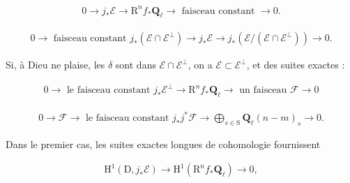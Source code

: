 \documentclass[10pt,leqno]{article}
\begin{document}
\begin{equation*}\begin{gathered}0 \longrightarrow  j_{*}\mathcal{E}  \longrightarrow  \mathrm{R}^{n} f_{*}\mathbf{Q}_{\ell } \longrightarrow \text{ faisceau constant }\longrightarrow  0.\end{gathered}\tag{7.1.2}\end{equation*}

\begin{equation*}\begin{gathered}0 \longrightarrow \text{ faisceau constant }j_{*}(\mathcal{E} \cap \mathcal{E} ^{\perp }) \longrightarrow  j_{*}\mathcal{E}  \longrightarrow  j_{*}(\mathcal{E} /(\mathcal{E} \cap \mathcal{E} ^{\perp })) \longrightarrow  0.\end{gathered}\tag{7.1.3}\end{equation*}

\noindent Si, à Dieu ne plaise, les \(\delta \) sont dans \(\mathcal{E} \cap \mathcal{E} ^{\perp }\), on a \(\mathcal{E} \subset \mathcal{E} ^{\perp }\), et des suites exactes :\par

\begin{equation*}\begin{gathered}0 \longrightarrow \text{ le faisceau constant }j_{*}\mathcal{E} ^{\perp } \longrightarrow  \mathrm{R}^{n} f_{*}\mathbf{Q}_{\ell } \longrightarrow \text{ un faisceau }\mathcal{F}  \longrightarrow  0\end{gathered}\tag{7.1.4}\end{equation*}

\begin{equation*}\begin{gathered}0 \longrightarrow  \mathcal{F}  \longrightarrow \text{ le faisceau constant }j_{*}j^{*}\mathcal{F}  \longrightarrow  \bigoplus\limits_{s\in \mathrm{S}}\mathbf{Q}_{\ell }(n- m)_{s} \longrightarrow  0.\end{gathered}\tag{7.1.5}\end{equation*}

\noindent Dans le premier cas, les suites exactes longues de cohomologie fournissent\par

\begin{equation*}\begin{gathered}\mathrm{H}^{1}(\mathrm{D},j_{*}\mathcal{E} ) \longrightarrow  \mathrm{H}^{1}(\mathrm{R}^{n} f_{*}\mathbf{Q}_{\ell }) \longrightarrow  0,\end{gathered}\tag{7.1.2′}\end{equation*}
\end{document}
